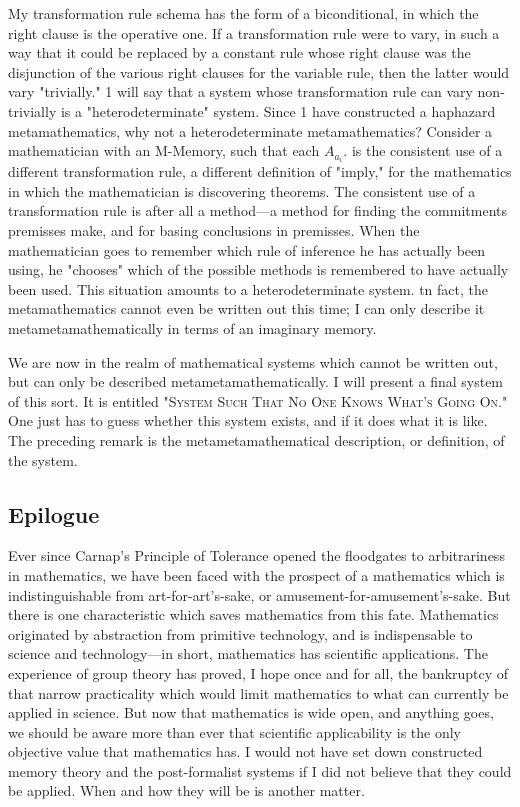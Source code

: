 My transformation rule schema has the form of a biconditional, in 
which the right clause is the operative one. If a transformation rule were to 
vary, in such a way that it could be replaced by a constant rule whose right 
clause was the disjunction of the various right clauses for the variable rule, 
then the latter would vary "trivially." 1 will say that a system whose 
transformation rule can vary non-trivially is a "heterodeterminate" system. 
Since 1 have constructed a haphazard metamathematics, why not a 
heterodeterminate metamathematics? Consider a mathematician with an 
M-Memory, such that each $A_{a_i}$. is the consistent use of a different 
transformation rule, a different definition of "imply," for the mathematics 
in which the mathematician is discovering theorems. The consistent use of a 
transformation rule is after all a method---a method for finding the 
commitments premisses make, and for basing conclusions in premisses. When 
the mathematician goes to remember which rule of inference he has actually 
been using, he "chooses" which of the possible methods is remembered to 
have actually been used. This situation amounts to a heterodeterminate 
system. tn fact, the metamathematics cannot even be written out this time; I 
can only describe it metametamathematically in terms of an imaginary 
memory. 

We are now in the realm of mathematical systems which cannot be 
written out, but can only be described metametamathematically. I will 
present a final system of this sort. It is entitled \textsc{"System Such That No One 
Knows What's Going On."} One just has to guess whether this system exists, 
and if it does what it is like. The preceding remark is the 
metametamathematical description, or definition, of the system. 

\subsection{Epilogue}

Ever since Carnap's Principle of Tolerance opened the floodgates to 
arbitrariness in mathematics, we have been faced with the prospect of a 
mathematics which is  indistinguishable from  art-for-art's-sake, or 
amusement-for-amusement's-sake. But there is one characteristic which saves 
mathematics from this fate. Mathematics originated by abstraction from 
primitive technology, and is indispensable to science and technology---in 
short, mathematics has scientific applications. The experience of group 
theory has proved, I hope once and for all, the bankruptcy of that narrow 
practicality which would limit mathematics to what can currently be applied 
in science. But now that mathematics is wide open, and anything goes, we 
should be aware more than ever that scientific applicability is the only 
objective value that mathematics has. I would not have set down constructed 
memory theory and the post-formalist systems if I did not believe that they 
could be applied. When and how they will be is another matter. 


